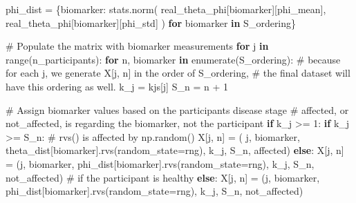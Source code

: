\documentclass[
  letterpaper,
  DIV=11,
  numbers=noendperiod]{scrreprt}
\newenvironment{Shaded}{\begin{snugshade}}{\end{snugshade}}
\newcommand{\BuiltInTok}[1]{\textcolor[rgb]{0.00,0.23,0.31}{#1}}
\newcommand{\CommentTok}[1]{\textcolor[rgb]{0.37,0.37,0.37}{#1}}
\newcommand{\ControlFlowTok}[1]{\textcolor[rgb]{0.00,0.23,0.31}{\textbf{#1}}}
\newcommand{\DecValTok}[1]{\textcolor[rgb]{0.68,0.00,0.00}{#1}}
\newcommand{\KeywordTok}[1]{\textcolor[rgb]{0.00,0.23,0.31}{\textbf{#1}}}
\newcommand{\NormalTok}[1]{\textcolor[rgb]{0.00,0.23,0.31}{#1}}
\newcommand{\OperatorTok}[1]{\textcolor[rgb]{0.37,0.37,0.37}{#1}}
\newcommand{\StringTok}[1]{\textcolor[rgb]{0.13,0.47,0.30}{#1}}
\begin{document}
\begin{Shaded}
\begin{Highlighting}[]
\NormalTok{    phi\_dist }\OperatorTok{=}\NormalTok{ \{biomarker: stats.norm(}
\NormalTok{        real\_theta\_phi[biomarker][}\StringTok{\textquotesingle{}phi\_mean\textquotesingle{}}\NormalTok{],}
\NormalTok{        real\_theta\_phi[biomarker][}\StringTok{\textquotesingle{}phi\_std\textquotesingle{}}\NormalTok{]}
\NormalTok{    ) }\ControlFlowTok{for}\NormalTok{ biomarker }\KeywordTok{in}\NormalTok{ S\_ordering\}}

    \CommentTok{\# Populate the matrix with biomarker measurements}
    \ControlFlowTok{for}\NormalTok{ j }\KeywordTok{in} \BuiltInTok{range}\NormalTok{(n\_participants):}
        \ControlFlowTok{for}\NormalTok{ n, biomarker }\KeywordTok{in} \BuiltInTok{enumerate}\NormalTok{(S\_ordering):}
            \CommentTok{\# because for each j, we generate X[j, n] in the order of S\_ordering,}
            \CommentTok{\# the final dataset will have this ordering as well.}
\NormalTok{            k\_j }\OperatorTok{=}\NormalTok{ kjs[j]}
\NormalTok{            S\_n }\OperatorTok{=}\NormalTok{ n }\OperatorTok{+} \DecValTok{1}

            \CommentTok{\# Assign biomarker values based on the participant\textquotesingle{}s disease stage}
            \CommentTok{\# affected, or not\_affected, is regarding the biomarker, not the participant}
            \ControlFlowTok{if}\NormalTok{ k\_j }\OperatorTok{\textgreater{}=} \DecValTok{1}\NormalTok{:}
                \ControlFlowTok{if}\NormalTok{ k\_j }\OperatorTok{\textgreater{}=}\NormalTok{ S\_n:}
                    \CommentTok{\# rvs() is affected by np.random()}
\NormalTok{                    X[j, n] }\OperatorTok{=}\NormalTok{ (}
\NormalTok{                        j, biomarker, theta\_dist[biomarker].rvs(random\_state}\OperatorTok{=}\NormalTok{rng), k\_j, S\_n, }\StringTok{\textquotesingle{}affected\textquotesingle{}}\NormalTok{)}
                \ControlFlowTok{else}\NormalTok{:}
\NormalTok{                    X[j, n] }\OperatorTok{=}\NormalTok{ (j, biomarker, phi\_dist[biomarker].rvs(random\_state}\OperatorTok{=}\NormalTok{rng),}
\NormalTok{                               k\_j, S\_n, }\StringTok{\textquotesingle{}not\_affected\textquotesingle{}}\NormalTok{)}
            \CommentTok{\# if the participant is healthy}
            \ControlFlowTok{else}\NormalTok{:}
\NormalTok{                X[j, n] }\OperatorTok{=}\NormalTok{ (j, biomarker, phi\_dist[biomarker].rvs(random\_state}\OperatorTok{=}\NormalTok{rng),}
\NormalTok{                           k\_j, S\_n, }\StringTok{\textquotesingle{}not\_affected\textquotesingle{}}\NormalTok{)}


\end{Highlighting}
\end{Shaded}
\end{document}
